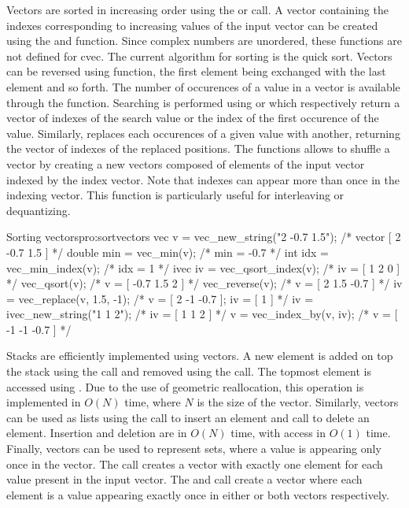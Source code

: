     Vectors are sorted in increasing order using the
     or  call. A vector
    containing the indexes corresponding to increasing values of the
    input vector can be created using the
     and 
    function. Since complex numbers are unordered, these functions are
    not defined for cvec. The current algorithm for sorting is the
    quick sort. Vectors can be reversed using
     function, the first element being
    exchanged with the last element and so forth. The number of
    occurences of a value in a vector is available through the
     function. Searching is performed using
     or  which
    respectively return a vector of indexes of the search value or the
    index of the first occurence of the value. Similarly,
     replaces each occurences of a given
    value with another, returning the vector of indexes of the
    replaced positions. The  functions
    allows to shuffle a vector by creating a new vectors composed of
    elements of the input vector indexed by the index vector. Note
    that indexes can appear more than once in the indexing
    vector. This function is particularly useful for interleaving or
    dequantizing.

\begin{program}{Sorting vectors}{pro:sortvectors}
vec v = vec_new_string("2 -0.7 1.5");  /* vector [ 2 -0.7 1.5 ]         */
double min = vec_min(v);               /* min = -0.7                    */
int idx = vec_min_index(v);            /* idx = 1                       */
ivec iv = vec_qsort_index(v);          /* iv = [ 1 2 0 ]                */
vec_qsort(v);                          /* v = [ -0.7 1.5 2 ]            */
vec_reverse(v);                        /* v = [ 2 1.5 -0.7 ]            */
iv = vec_replace(v, 1.5, -1);          /* v = [ 2 -1 -0.7 ]; iv = [ 1 ] */
iv = ivec_new_string("1 1 2");         /* iv = [ 1 1 2 ] */
v = vec_index_by(v, iv);               /* v = [ -1 -1 -0.7 ] */
\end{program}

    Stacks are efficiently implemented using vectors. A new element is
    added on top the stack using the  call and
    removed using the  call. The topmost element
    is accessed using . Due to the use of
    geometric reallocation, this operation is implemented in $O(N)$
    time, where $N$ is the size of the vector. Similarly, vectors can
    be used as lists using the  call to insert an
    element and  call to delete an
    element. Insertion and deletion are in $O(N)$ time, with access in
    $O(1)$ time. Finally, vectors can be used to represent sets, where
    a value is appearing only once in the vector. The
     call creates a vector with exactly one
    element for each value present in the input vector. The
     and  call create a
    vector where each element is a value appearing exactly once in
    either or both vectors respectively.

